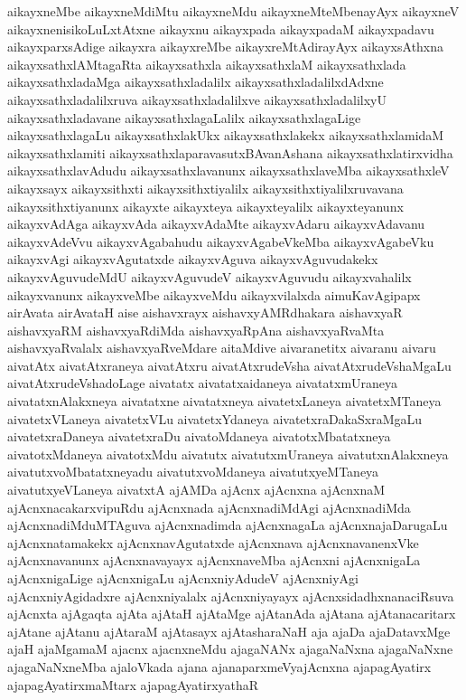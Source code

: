 {aikayxneMbe
aikayxneMdiMtu
aikayxneMdu
aikayxneMteMbenayAyx
aikayxneV
aikayxnenisikoLuLxtAtxne
aikayxnu
aikayxpada
aikayxpadaM
aikayxpadavu
aikayxparxsAdige
aikayxra
aikayxreMbe
aikayxreMtAdirayAyx
aikayxsAthxna
aikayxsathxlAMtagaRta
aikayxsathxla
aikayxsathxlaM
aikayxsathxlada
aikayxsathxladaMga
aikayxsathxladalilx
aikayxsathxladalilxdAdxne
aikayxsathxladalilxruva
aikayxsathxladalilxve
aikayxsathxladalilxyU
aikayxsathxladavane
aikayxsathxlagaLalilx
aikayxsathxlagaLige
aikayxsathxlagaLu
aikayxsathxlakUkx
aikayxsathxlakekx
aikayxsathxlamidaM
aikayxsathxlamiti
aikayxsathxlaparavasutxBAvanAshana
aikayxsathxlatirxvidha
aikayxsathxlavAdudu
aikayxsathxlavanunx
aikayxsathxlaveMba
aikayxsathxleV
aikayxsayx
aikayxsithxti
aikayxsithxtiyalilx
aikayxsithxtiyalilxruvavana
aikayxsithxtiyanunx
aikayxte
aikayxteya
aikayxteyalilx
aikayxteyanunx
aikayxvAdAga
aikayxvAda
aikayxvAdaMte
aikayxvAdaru
aikayxvAdavanu
aikayxvAdeVvu
aikayxvAgabahudu
aikayxvAgabeVkeMba
aikayxvAgabeVku
aikayxvAgi
aikayxvAgutatxde
aikayxvAguva
aikayxvAguvudakekx
aikayxvAguvudeMdU
aikayxvAguvudeV
aikayxvAguvudu
aikayxvahalilx
aikayxvanunx
aikayxveMbe
aikayxveMdu
aikayxvilalxda
aimuKavAgipapx
airAvata
airAvataH
aise
aishavxrayx
aishavxyAMRdhakara
aishavxyaR
aishavxyaRM
aishavxyaRdiMda
aishavxyaRpAna
aishavxyaRvaMta
aishavxyaRvalalx
aishavxyaRveMdare
aitaMdive
aivaranetitx
aivaranu
aivaru
aivatAtx
aivatAtxraneya
aivatAtxru
aivatAtxrudeVsha
aivatAtxrudeVshaMgaLu
aivatAtxrudeVshadoLage
aivatatx
aivatatxaidaneya
aivatatxmUraneya
aivatatxnAlakxneya
aivatatxne
aivatatxneya
aivatetxLaneya
aivatetxMTaneya
aivatetxVLaneya
aivatetxVLu
aivatetxYdaneya
aivatetxraDakaSxraMgaLu
aivatetxraDaneya
aivatetxraDu
aivatoMdaneya
aivatotxMbatatxneya
aivatotxMdaneya
aivatotxMdu
aivatutx
aivatutxmUraneya
aivatutxnAlakxneya
aivatutxvoMbatatxneyadu
aivatutxvoMdaneya
aivatutxyeMTaneya
aivatutxyeVLaneya
aivatxtA
ajAMDa
ajAcnx
ajAcnxna
ajAcnxnaM
ajAcnxnacakarxvipuRdu
ajAcnxnada
ajAcnxnadiMdAgi
ajAcnxnadiMda
ajAcnxnadiMduMTAguva
ajAcnxnadimda
ajAcnxnagaLa
ajAcnxnajaDarugaLu
ajAcnxnatamakekx
ajAcnxnavAgutatxde
ajAcnxnava
ajAcnxnavanenxVke
ajAcnxnavanunx
ajAcnxnavayayx
ajAcnxnaveMba
ajAcnxni
ajAcnxnigaLa
ajAcnxnigaLige
ajAcnxnigaLu
ajAcnxniyAdudeV
ajAcnxniyAgi
ajAcnxniyAgidadxre
ajAcnxniyalalx
ajAcnxniyayayx
ajAcnxsidadhxnanaciRsuva
ajAcnxta
ajAgaqta
ajAta
ajAtaH
ajAtaMge
ajAtanAda
ajAtana
ajAtanacaritarx
ajAtane
ajAtanu
ajAtaraM
ajAtasayx
ajAtasharaNaH
aja
ajaDa
ajaDatavxMge
ajaH
ajaMgamaM
ajacnx
ajacnxneMdu
ajagaNANx
ajagaNaNxna
ajagaNaNxne
ajagaNaNxneMba
ajaloVkada
ajana
ajanaparxmeVyajAcnxna
ajapagAyatirx
ajapagAyatirxmaMtarx
ajapagAyatirxyathaR
}
